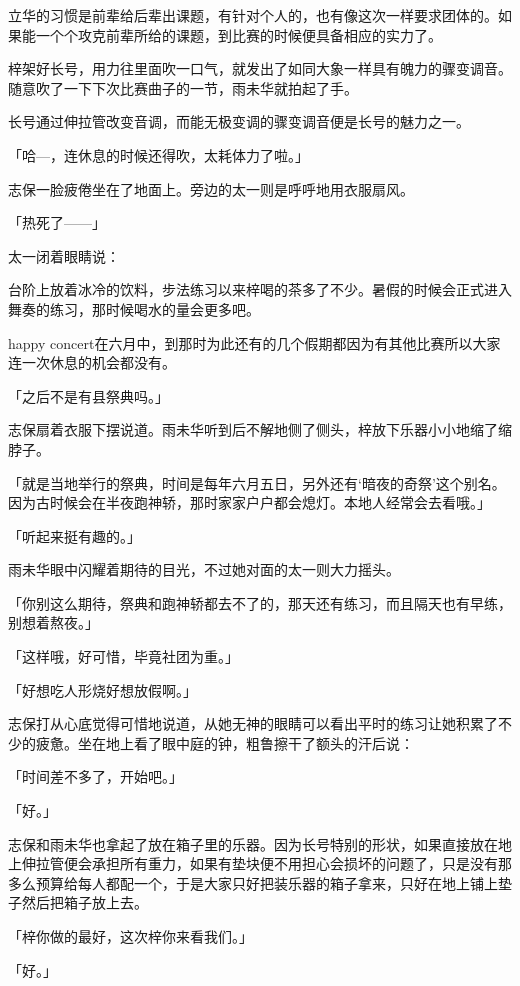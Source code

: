 \documentclass[UTF8]{ctexart}
\begin{document}
    立华的习惯是前辈给后辈出课题，有针对个人的，也有像这次一样要求团体的。如果能一个个攻克前辈所给的课题，到比赛的时候便具备相应的实力了。

    梓架好长号，用力往里面吹一口气，就发出了如同大象一样具有魄力的骤变调音。随意吹了一下下次比赛曲子的一节，雨未华就拍起了手。

    长号通过伸拉管改变音调，而能无极变调的骤变调音便是长号的魅力之一。

    「哈—，连休息的时候还得吹，太耗体力了啦。」

    志保一脸疲倦坐在了地面上。旁边的太一则是呼呼地用衣服扇风。

    「热死了——」

    太一闭着眼睛说：

    台阶上放着冰冷的饮料，步法练习以来梓喝的茶多了不少。暑假的时候会正式进入舞奏的练习，那时候喝水的量会更多吧。

    happy concert在六月中，到那时为此还有的几个假期都因为有其他比赛所以大家连一次休息的机会都没有。

    「之后不是有县祭典吗。」

    志保扇着衣服下摆说道。雨未华听到后不解地侧了侧头，梓放下乐器小小地缩了缩脖子。

    「就是当地举行的祭典，时间是每年六月五日，另外还有‘暗夜的奇祭’这个别名。因为古时候会在半夜跑神轿，那时家家户户都会熄灯。本地人经常会去看哦。」

    「听起来挺有趣的。」

    雨未华眼中闪耀着期待的目光，不过她对面的太一则大力摇头。

    「你别这么期待，祭典和跑神轿都去不了的，那天还有练习，而且隔天也有早练，别想着熬夜。」

    「这样哦，好可惜，毕竟社团为重。」

    「好想吃人形烧好想放假啊。」

    志保打从心底觉得可惜地说道，从她无神的眼睛可以看出平时的练习让她积累了不少的疲惫。坐在地上看了眼中庭的钟，粗鲁擦干了额头的汗后说：

    「时间差不多了，开始吧。」

    「好。」

    志保和雨未华也拿起了放在箱子里的乐器。因为长号特别的形状，如果直接放在地上伸拉管便会承担所有重力，如果有垫块便不用担心会损坏的问题了，只是没有那多么预算给每人都配一个，于是大家只好把装乐器的箱子拿来，只好在地上铺上垫子然后把箱子放上去。

    「梓你做的最好，这次梓你来看我们。」

    「好。」
\end{document}
